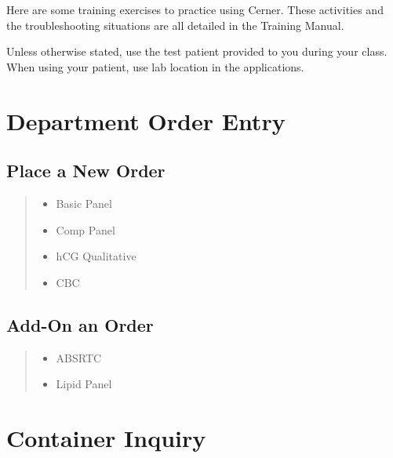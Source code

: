 \setcounter{page}{1}
Here are some training exercises to practice using Cerner. These activities and the troubleshooting situations are all detailed in the Training Manual.

Unless otherwise stated, use the test patient provided to you during your class. When using your patient, use  lab location in the applications.

\section{Department Order Entry}

    \subsection{Place a New Order}



    \begin{quote}
        \begin{itemize}
            \item Basic Panel
            \item Comp Panel
            \item hCG Qualitative
            \item CBC
        \end{itemize}
    \end{quote}


    \subsection{Add-On an Order}


        \begin{quote}
        \begin{itemize}
            \item ABSRTC
            \item Lipid Panel
        \end{itemize}
        \end{quote}


\section{Container Inquiry}

